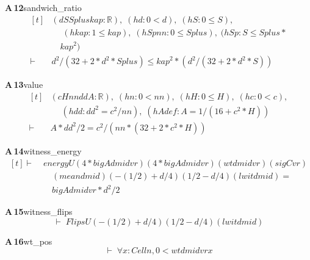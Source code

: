 \documentclass[conference]{IEEEtran}
\theoremstyle{definition}
\newcommand{\lean}[1]{\textsf{\footnotesize #1}}
\begin{document}
\noindent\textbf{A\,12}\quad\lean{sandwich\_ratio}
{\footnotesize\[ \begin{aligned}[t]
&(\mathit{d} \mathit{S} \mathit{Splus} \mathit{kap} : \mathbb{R} ),\; (\mathit{hd} : 0 < \mathit{d}),\; (\mathit{hS} : 0 \leq \mathit{S}),\\
&\quad \; (\mathit{hkap} : 1 \leq \mathit{kap}),\; (\mathit{hSpnn} : 0 \leq \mathit{Splus}),\; (\mathit{hSp} : \mathit{S} \leq \mathit{Splus} *\\
&\quad \mathit{kap} ^{2})\\
\vdash\;&\mathit{d} ^{2} / (32 + 2 * \mathit{d} ^{2} * \mathit{Splus}) \leq \mathit{kap} ^{2} * (\mathit{d} ^{2} / (32 + 2 * \mathit{d} ^{2} * \mathit{S}))
\end{aligned} \]}

\noindent\textbf{A\,13}\quad\lean{value}
{\footnotesize\[ \begin{aligned}[t]
&(\mathit{c} \mathit{H} \mathit{nn} \mathit{dd} \mathit{A} : \mathbb{R} ),\; (\mathit{hn} : 0 < \mathit{nn}),\; (\mathit{hH} : 0 \leq \mathit{H}),\; (\mathit{hc} : 0 < \mathit{c}),\\
&\quad \; (\mathit{hdd} : \mathit{dd} ^{2} = \mathit{c} ^{2} / \mathit{nn}),\; (\mathit{hAdef} : \mathit{A} = 1 / (16 + \mathit{c} ^{2} * \mathit{H}))\\
\vdash\;&\mathit{A} * \mathit{dd} ^{2} / 2 = \mathit{c} ^{2} / (\mathit{nn} * (32 + 2 * \mathit{c} ^{2} * \mathit{H}))
\end{aligned} \]}

\noindent\textbf{A\,14}\quad\lean{witness\_energy}
{\footnotesize\[ \begin{aligned}[t]
\vdash\;&\mathit{energyU} (4 * \mathit{bigA} \mathit{d} \mathit{mid} \mathit{vr}) (4 * \mathit{bigA} \mathit{d} \mathit{mid} \mathit{vr}) (\mathit{wt} \mathit{d} \mathit{mid} \mathit{vr}) (\mathit{sigC} \mathit{vr})\\
&\quad (\mathit{mean} \mathit{d} \mathit{mid}) (-(1/2) + \mathit{d}/4) (1/2 - \mathit{d}/4) (\mathit{lwit} \mathit{d} \mathit{mid}) =\\
&\quad \mathit{bigA} \mathit{d} \mathit{mid} \mathit{vr} * \mathit{d} ^{2} / 2
\end{aligned} \]}

\noindent\textbf{A\,15}\quad\lean{witness\_flips}
{\footnotesize\[ \vdash\; \mathit{FlipsU} (-(1/2) + \mathit{d}/4) (1/2 - \mathit{d}/4) (\mathit{lwit} \mathit{d} \mathit{mid}) \]}

\noindent\textbf{A\,16}\quad\lean{wt\_pos}
{\footnotesize\[ \vdash\; \forall \mathit{x} : \mathit{Cell} \mathit{n}, 0 < \mathit{wt} \mathit{d} \mathit{mid} \mathit{vr} \mathit{x} \]}
\end{document}
